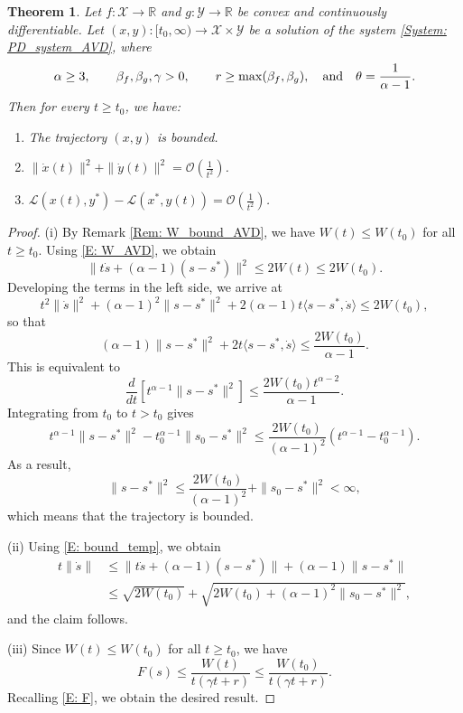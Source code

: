 \documentclass[pdflatex,sn-mathphys-num]{sn-jnl}
\theoremstyle{thmstyleone}
\newtheorem{theorem}{Theorem}
\theoremstyle{thmstyletwo}
\theoremstyle{thmstylethree}
\newcommand{\qbox}[1]{\quad\hbox{#1}\quad}
\newcommand{\R}{\mathbb{R}}
\newcommand{\X}{\mathcal{X}}
\newcommand{\Y}{\mathcal{Y}}
\begin{document}
\begin{theorem} \label{T:convex}
Let $f:\X\to\R$ and $g:\Y\to\R$ be convex and continuously differentiable. Let $(x,y):[t_0,\infty)\to\X\times\Y$ be a solution of the system \eqref{System: PD_system_AVD}, where
$$\alpha\ge 3, \qbox{}\beta_f,\beta_g,\gamma>0, \qbox{} r\ge\max(\beta_f,\beta_g),\qbox{and} \theta = \frac{1}{\alpha-1}. $$
Then for every $t\ge t_0$, we have:
\begin{enumerate}[label=(\roman*), itemsep=0.7em, leftmargin=12mm]
\item The trajectory $(x,y)$ is bounded.

\item $\| \dot{x}(t) \|^2 + \| \dot{y}(t) \|^2   = \mathcal{O}\left( \frac{1}{t^2} \right)$. 

\item $\mathcal{L}(x(t),y^*) - \mathcal{L}(x^*,y(t)) =\mathcal{O}\left( \frac{1}{t^2} \right) %
$. 
\end{enumerate} 
\end{theorem}


\begin{proof}
(i) By Remark \ref{Rem: W_bound_AVD}, we have $W(t)\le W(t_0)$ for all $t\ge t_0$. Using \eqref{E: W_AVD}, we obtain
\begin{equation}\label{E: bound_temp}
\| t\dot{s} + (\alpha-1)(s-s^*) \|^2 \le 2W(t) \le 2W(t_0).
\end{equation}
Developing the terms in the left side, we arrive at
$$ t^2\| \dot{s} \|^2 + (\alpha-1)^2 \| s-s^* \|^2 + 2(\alpha-1)t\langle s-s^*, \dot{s} \rangle \le 2W(t_0), $$
so that
$$ (\alpha-1)\| s-s^* \|^2 + 2t \langle s-s^*, \dot{s} \rangle \le \frac{2W(t_0)}{\alpha-1}. $$ 
This is equivalent to
$$ \frac{d}{dt}\left[ t^{\alpha-1}\| s-s^* \|^2 \right] \le \frac{2W(t_0) t^{\alpha-2}}{\alpha-1}. $$
Integrating from $t_0$ to $t>t_0$ gives
$$ t^{\alpha-1}\| s-s^* \|^2 - t_0^{\alpha-1}\| s_0-s^* \|^2 \le \frac{2W(t_0)}{(\alpha-1)^2}\left( t^{\alpha-1} - t_0^{\alpha-1} \right).  $$
As a result,
$$ \| s-s^* \|^2 \le \frac{2W(t_0)}{(\alpha-1)^2} + \| s_0-s^* \|^2 < \infty, $$
which means that the trajectory is bounded. 

(ii) Using \eqref{E: bound_temp}, we obtain
\begin{align*}
    t\| \dot{s} \| & \le \| t\dot{s} + (\alpha-1)(s-s^*) \| + (\alpha-1)\| s-s^* \| \\
    & \le \sqrt{2W(t_0)} + \sqrt{2W(t_0)+(\alpha-1)^2\|s_0-s^*\|^2},
\end{align*}
and the claim follows.

(iii) Since $W(t) \le W(t_0)$ for all $t\ge t_0$, we have
$$ F(s) \le \frac{W(t)}{t(\gamma t + r)} \le \frac{W(t_0)}{t(\gamma t + r)}. $$ 
Recalling \eqref{E: F}, we obtain the desired result.
\end{proof}
\end{document}
